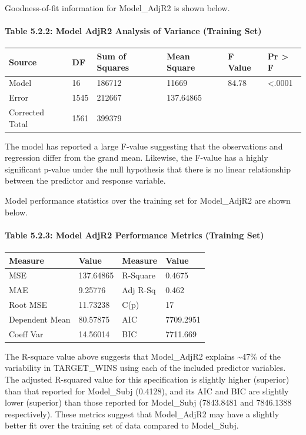 \documentclass[]{article}
\let\oldparagraph\paragraph
\renewcommand{\paragraph}[1]{\oldparagraph{#1}\mbox{}}
\begin{document}
Goodness-of-fit information for Model\_AdjR2 is shown below.

\paragraph{Table 5.2.2: Model AdjR2 Analysis of Variance (Training
Set)}\label{table-5.2.2-model-adjr2-analysis-of-variance-training-set}

\begin{longtable}[]{@{}llllll@{}}
\toprule
Source & DF & Sum of Squares & Mean Square & F Value & Pr \textgreater{}
F\tabularnewline
\midrule
\endhead
Model & 16 & 186712 & 11669 & 84.78 & \textless{}.0001\tabularnewline
Error & 1545 & 212667 & 137.64865 & &\tabularnewline
Corrected Total & 1561 & 399379 & & &\tabularnewline
\bottomrule
\end{longtable}

The model has reported a large F-value suggesting that the observations
and regression differ from the grand mean. Likewise, the F-value has a
highly significant p-value under the null hypothesis that there is no
linear relationship between the predictor and response variable.

Model performance statistics over the training set for Model\_AdjR2 are
shown below.

\paragraph{Table 5.2.3: Model AdjR2 Performance Metrics (Training
Set)}\label{table-5.2.3-model-adjr2-performance-metrics-training-set}

\begin{longtable}[]{@{}llll@{}}
\toprule
Measure & Value & Measure & Value\tabularnewline
\midrule
\endhead
MSE & 137.64865 & R-Square & 0.4675\tabularnewline
MAE & 9.25776 & Adj R-Sq & 0.462\tabularnewline
Root MSE & 11.73238 & C(p) & 17\tabularnewline
Dependent Mean & 80.57875 & AIC & 7709.2951\tabularnewline
Coeff Var & 14.56014 & BIC & 7711.669\tabularnewline
\bottomrule
\end{longtable}

The R-square value above suggests that Model\_AdjR2 explains
\textasciitilde{}47\% of the variability in TARGET\_WINS using each of
the included predictor variables. The adjusted R-squared value for this
specification is slightly higher (superior) than that reported for
Model\_Subj (0.4128), and its AIC and BIC are slightly lower (superior)
than those reported for Model\_Subj (7843.8481 and 7846.1388
respectively). These metrics suggest that Model\_AdjR2 may have a
slightly better fit over the training set of data compared to
Model\_Subj.
\end{document}
